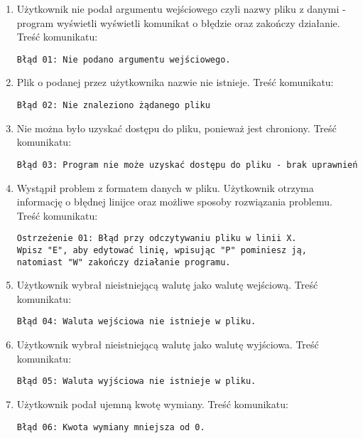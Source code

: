 ﻿\documentclass{article}
\begin{document}
\begin{enumerate}
\item Użytkownik nie podał argumentu wejściowego czyli nazwy pliku z danymi - program wyświetli wyświetli komunikat o błędzie oraz zakończy działanie. Treść komunikatu: \begin{verbatim}Błąd 01: Nie podano argumentu wejściowego.\end{verbatim}
\item Plik o podanej przez użytkownika nazwie nie istnieje. Treść komunikatu: \begin{verbatim}Błąd 02: Nie znaleziono żądanego pliku\end{verbatim}
\item Nie można było uzyskać dostępu do pliku, ponieważ jest chroniony. Treść komunikatu: \begin{verbatim}Błąd 03: Program nie może uzyskać dostępu do pliku - brak uprawnień\end{verbatim}
\item Wystąpił problem z formatem danych w pliku. Użytkownik otrzyma informację o błędnej linijce oraz możliwe sposoby rozwiązania problemu. Treść komunikatu:\begin{verbatim}Ostrzeżenie 01: Błąd przy odczytywaniu pliku w linii X.
Wpisz "E", aby edytować linię, wpisując "P" pominiesz ją,
natomiast "W" zakończy działanie programu. \end{verbatim}
\item Użytkownik wybrał nieistniejącą walutę jako walutę wejściową. Treść komunikatu:\begin{verbatim}Błąd 04: Waluta wejściowa nie istnieje w pliku.\end{verbatim}
\item Użytkownik wybrał nieistniejącą walutę jako walutę wyjściowa. Treść komunikatu:\begin{verbatim}Błąd 05: Waluta wyjściowa nie istnieje w pliku.\end{verbatim}
\item Użytkownik podał ujemną kwotę wymiany. Treść komunikatu:\begin{verbatim}Błąd 06: Kwota wymiany mniejsza od 0.\end{verbatim}
\end{enumerate}
\end{document}
